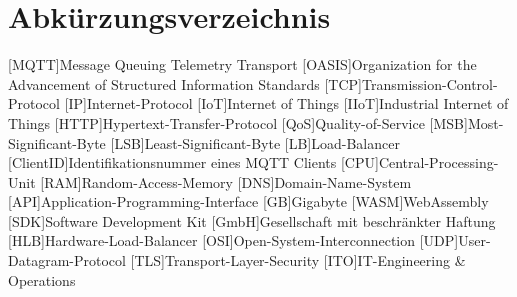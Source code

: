 

\section*{Abkürzungsverzeichnis}
\begin{acronym}[xxxxxxxxxx] %
    [MQTT]{Message Queuing Telemetry Transport}
    [OASIS]{Organization for the Advancement of Structured Information Standards}
    [TCP]{Transmission-Control-Protocol}
    [IP]{Internet-Protocol}
    [IoT]{Internet of Things}
    [IIoT]{Industrial Internet of Things}
    [HTTP]{Hypertext-Transfer-Protocol}
    [QoS]{Quality-of-Service}
    [MSB]{Most-Significant-Byte}
    [LSB]{Least-Significant-Byte}
    [LB]{Load-Balancer}
    [ClientID]{Identifikationsnummer eines MQTT Clients}
    [CPU]{Central-Processing-Unit}
    [RAM]{Random-Access-Memory}
    [DNS]{Domain-Name-System}
    [API]{Application-Programming-Interface}
    [GB]{Gigabyte}
    [WASM]{WebAssembly}
    [SDK]{Software Development Kit}
    [GmbH]{Gesellschaft mit beschränkter Haftung}
    [HLB]{Hardware-Load-Balancer}
    [OSI]{Open-System-Interconnection}
    [UDP]{User-Datagram-Protocol}
    [TLS]{Transport-Layer-Security}
    [ITO]{IT-Engineering \& Operations}
\end{acronym}
\newpage
